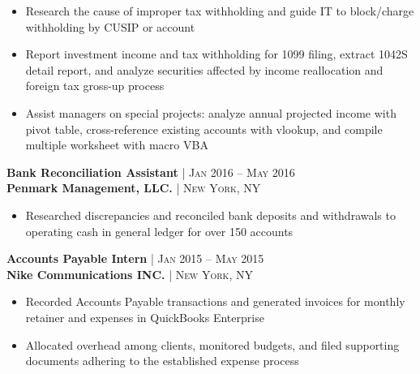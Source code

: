 \documentclass[10pt]{article} %
\begin{document}
{\begin{minipage}[t]{0.5\textwidth}
\begin{itemize}[leftmargin=*, topsep=2pt, partopsep=2.5pt]
\item Research the cause of improper tax withholding and guide IT to block/charge withholding by CUSIP or account

\item Report investment income and tax withholding for 1099 filing, extract 1042S detail report, and analyze securities affected by income reallocation and foreign tax gross-up process

\item Assist managers on special projects: analyze annual projected income with pivot table, cross-reference existing accounts with vlookup, and compile multiple worksheet with macro VBA

\end{itemize}



{\raggedright\normalsize
\textbf{Bank Reconciliation Assistant} {\hfill\footnotesize\textsc{| Jan 2016 -- May 2016}} \\ 
\textbf{Penmark Management, LLC.} {\hfill\footnotesize\textsc{| New York, NY}}}

\begin{itemize}[leftmargin=*, topsep=2pt, partopsep=2.5pt]
\setlength\itemsep{1pt}
\item Researched discrepancies and reconciled bank deposits and withdrawals to operating cash in general ledger for over 150 accounts
\end{itemize}



{\raggedright\normalsize
\textbf{Accounts Payable Intern} {\hfill\footnotesize\textsc{| Jan 2015 -- May 2015}} \\ 
\textbf{Nike Communications INC.} {\hfill\footnotesize\textsc{| New York, NY}}}

\begin{itemize}[leftmargin=*, topsep=2pt, partopsep=2.5pt]
\setlength\itemsep{1pt}
\item Recorded Accounts Payable transactions and generated invoices for monthly retainer and expenses in QuickBooks Enterprise 
\item Allocated overhead among clients, monitored budgets, and filed supporting documents adhering to the established expense process  
\end{itemize}



\end{minipage}}
\end{document}
